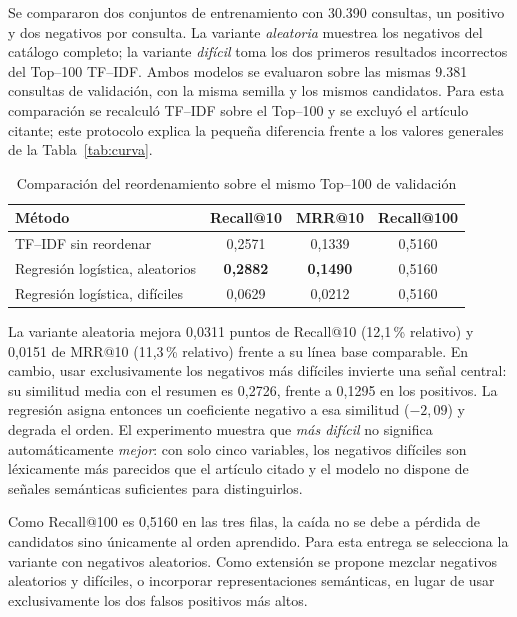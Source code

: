 \documentclass[11pt]{article}
\begin{document}
Se compararon dos conjuntos de entrenamiento con 30.390 consultas, un positivo y dos negativos por consulta. La variante \emph{aleatoria} muestrea los negativos del catálogo completo; la variante \emph{difícil} toma los dos primeros resultados incorrectos del Top--100 TF--IDF. Ambos modelos se evaluaron sobre las mismas 9.381 consultas de validación, con la misma semilla y los mismos candidatos. Para esta comparación se recalculó TF--IDF sobre el Top--100 y se excluyó el artículo citante; este protocolo explica la pequeña diferencia frente a los valores generales de la Tabla~\ref{tab:curva}.

\begin{table}[h!]
\centering
\small
\caption{Comparación del reordenamiento sobre el mismo Top--100 de validación}
\label{tab:supervisado}
\begin{tabular}{l c c c}
\toprule
\textbf{Método} & \textbf{Recall@10} & \textbf{MRR@10} & \textbf{Recall@100} \\
\midrule
TF--IDF sin reordenar             & 0,2571 & 0,1339 & 0,5160 \\
Regresión logística, aleatorios   & \textbf{0,2882} & \textbf{0,1490} & 0,5160 \\
Regresión logística, difíciles    & 0,0629 & 0,0212 & 0,5160 \\
\bottomrule
\end{tabular}
\end{table}

La variante aleatoria mejora 0,0311 puntos de Recall@10 (12,1\,\% relativo) y 0,0151 de MRR@10 (11,3\,\% relativo) frente a su línea base comparable. En cambio, usar exclusivamente los negativos más difíciles invierte una señal central: su similitud media con el resumen es 0,2726, frente a 0,1295 en los positivos. La regresión asigna entonces un coeficiente negativo a esa similitud ($-2{,}09$) y degrada el orden. El experimento muestra que \emph{más difícil} no significa automáticamente \emph{mejor}: con solo cinco variables, los negativos difíciles son léxicamente más parecidos que el artículo citado y el modelo no dispone de señales semánticas suficientes para distinguirlos.

Como Recall@100 es 0,5160 en las tres filas, la caída no se debe a pérdida de candidatos sino únicamente al orden aprendido. Para esta entrega se selecciona la variante con negativos aleatorios. Como extensión se propone mezclar negativos aleatorios y difíciles, o incorporar representaciones semánticas, en lugar de usar exclusivamente los dos falsos positivos más altos.
\end{document}
